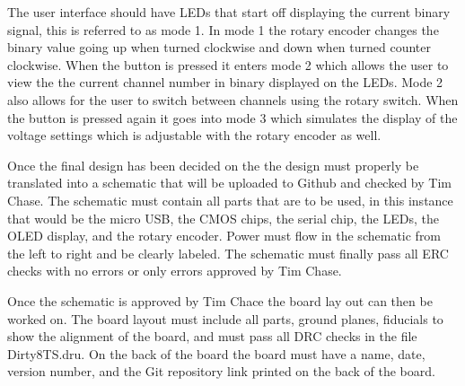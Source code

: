 \documentclass[12pt]{article}
\begin{document}
        \par The user interface should have LEDs that start off displaying the current binary signal, this is referred to as mode 1. In mode 1 the rotary encoder changes the binary value going up when turned clockwise and down when turned counter clockwise. When the button is pressed it enters mode 2 which allows the user to view the the current channel number in binary displayed on the LEDs. Mode 2 also allows for the user to switch between channels using the rotary switch. When the button is pressed again it goes into mode 3 which simulates the display of the voltage settings which is adjustable with the rotary encoder as well.
        \par Once the final design has been decided on the the design must properly be translated into a schematic that will be uploaded to Github and checked by Tim Chase. The schematic must contain all parts that are to be used, in this instance that would be the micro USB, the CMOS chips, the serial chip, the LEDs, the OLED display, and the rotary encoder. Power must flow in the schematic from the left to right and be clearly labeled. The schematic must finally pass all ERC checks with no errors or only errors approved by Tim Chase. 
        \par Once the schematic is approved by Tim Chace the board lay out can then be worked on. The board layout must include all parts, ground planes, fiducials to show the alignment of the board, and must pass all DRC checks in the file Dirty8TS.dru. On the back of the board the board must have a name, date, version number, and the Git repository link printed on the back of the board.
\end{document}
